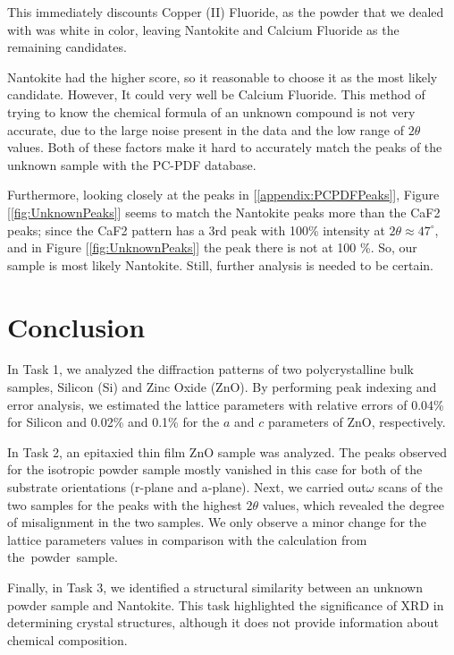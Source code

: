 \documentclass{article}
\begin{document}
This immediately discounts Copper (II) Fluoride, as the powder that we dealed with was white in color, leaving Nantokite and Calcium Fluoride as the remaining candidates.


Nantokite had the higher score, so it reasonable to choose it as the most likely candidate. However, It could very well be Calcium Fluoride. This method of trying to know the chemical formula of an unknown compound 
is not very accurate, due to the large noise present in the data and the low range of $2\theta$ values. Both of these factors make it hard to accurately match the peaks of the unknown sample with the PC-PDF database. 


	Furthermore, looking closely at the peaks in [\ref{appendix:PCPDFPeaks}], Figure [\ref{fig:UnknownPeaks}] seems to match the Nantokite peaks more than the CaF2 peaks; since the CaF2 pattern has a 3rd peak with 100\% intensity at $2\theta \approx 47^{\circ}$, and in Figure [\ref{fig:UnknownPeaks}] the peak there is not at 100 \%. So, our sample is most likely Nantokite. Still, further analysis is needed to be certain. 
\pagebreak{}

\section{Conclusion}

In Task 1, we analyzed the diffraction patterns of two polycrystalline bulk samples, Silicon (Si) and Zinc Oxide (ZnO). By performing peak indexing and error analysis, we estimated the lattice parameters with relative errors of 0.04\% for Silicon and 0.02\% and 0.1\% for the \(a\) and \(c\) parameters of ZnO, respectively.

In Task 2, an epitaxied thin film ZnO sample was analyzed. The peaks observed for the isotropic powder sample mostly vanished in this case for both of the substrate orientations (r-plane and a-plane). Next, we carried out$\omega$ scans of the two samples for the peaks with the highest $2\theta$ values, which revealed the degree of misalignment in the two samples. We only observe a minor change for the lattice parameters values in comparison with the calculation from the powder sample.

Finally, in Task 3, we identified a structural similarity between an unknown powder sample and Nantokite. This task highlighted the significance of XRD in determining crystal structures, although it does not provide information about chemical composition.

\pagebreak{}
\end{document}
